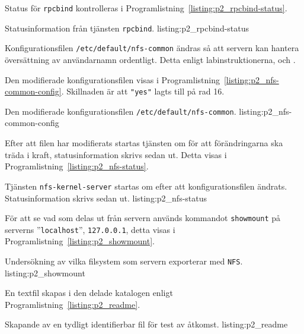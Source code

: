 Status för \texttt{rpcbind} kontrolleras i
Programlistning~\ref{listing:p2_rpcbind-status}.

            {Statusinformation från tjänsten \texttt{rpcbind}.}
            {listing:p2_rpcbind-status}


Konfigurationsfilen \texttt{/etc/default/nfs-common} ändras så att servern kan
hantera översättning av användarnamn ordentligt.
Detta enligt labinstruktionerna\cite{dvg001:instruktionerLab5},
\cite{ubuntu:NFSv4howto} och \cite{ubuntu:settingupNFShowto}.

Den modifierade konfigurationsfilen visas i
Programlistning~\ref{listing:p2_nfs-common-config}.
Skillnaden är att \texttt{"yes"} lagts till på rad 16.

            {Den modifierade konfigurationsfilen \texttt{/etc/default/nfs-common}.}
            {listing:p2_nfs-common-config}


Efter att filen har modifierats startas tjänsten om för att förändringarna
ska träda i kraft, statusinformation skrivs sedan ut. Detta visas i
Programlistning~\ref{listing:p2_nfs-status}.

            {Tjänsten \texttt{nfs-kernel-server} startas om efter att
             konfigurationsfilen ändrats. Statusinformation skrivs sedan ut.}
            {listing:p2_nfs-status}


För att se vad som delas ut från servern används kommandot \texttt{showmount}
på serverns ''\texttt{localhost}'', \texttt{127.0.0.1}, detta visas i 
Programlistning~\ref{listing:p2_showmount}.

            {Undersökning av vilka filsystem som servern exporterar med 
             \texttt{NFS}.}
            {listing:p2_showmount}

En textfil skapas i den delade katalogen enligt 
Programlistning~\ref{listing:p2_readme}.

            {Skapande av en tydligt identifierbar fil för test av åtkomst.}
            {listing:p2_readme}
